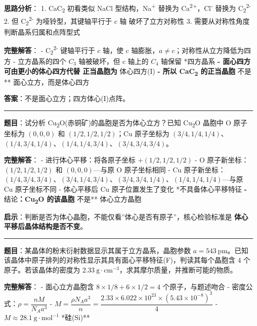 \textbf{思路分析}：
1. CaC\textsubscript{2} 初看类似 NaCl 型结构，Na\textsuperscript{+} 替换为 Ca\textsuperscript{2+}，Cl\textsuperscript{-} 替换为 C\textsubscript{2}\textsuperscript{2-}
2. 但 C\textsubscript{2}\textsuperscript{2-} 为哑铃型，其键轴平行于 c 轴 \箭 破坏了立方对称性
3. 需要从对称性角度判断晶系归属和点阵型式

\textbf{完整解答}：
- C\textsubscript{2}\textsuperscript{2-} 键轴平行于 c 轴，使 c 轴膨胀，\(a \neq c\)；对称性从立方降低为四方
- 立方晶系的四个 \(C_3\) 轴被破坏，但 c 轴上的 \(C_4\) 轴保留 \箭 **四方晶系\textbf{
- 面心四方可由更小的体心四方代替 \箭 正当晶胞为 }体心四方(I)\textbf{
- 所以 CaC\textsubscript{2} 的正当晶胞 }不是** 面心立方，而是体心四方

\textbf{答案}：不是面心立方；四方体心(I)点阵。

\begin{center}\rule{0.5\linewidth}{0.5pt}\end{center}

\textbf{题目}：试分析 Cu\textsubscript{2}O(赤铜矿)的晶胞是否为体心立方？已知 Cu\textsubscript{2}O 晶胞中 O 原子坐标为 \((0, 0, 0)\) 和 \((1/2, 1/2, 1/2)\)；Cu 原子坐标为 \((3/4, 1/4, 1/4)\)、\((1/4, 3/4, 1/4)\)、\((1/4, 1/4, 3/4)\)、\((3/4, 3/4, 3/4)\)。

\textbf{完整解答}：
- 进行体心平移：将各原子坐标 \(+(1/2, 1/2, 1/2)\)
- O 原子新坐标：\((1/2, 1/2, 1/2)\) 和 \((0, 0, 0)\)---与原 O 原子坐标相同
- Cu 原子新坐标：\((1/4, 3/4, 3/4)\)、\((3/4, 1/4, 3/4)\)、\((3/4, 3/4, 1/4)\)、\((1/4, 1/4, 1/4)\)---与原 Cu 原子坐标不同
- 体心平移后 Cu 原子位置发生了变化 \箭 **不具备体心平移特征\textbf{
- }结论\textbf{：Cu\textsubscript{2}O 的该晶胞 }不是** 体心立方晶胞

\textbf{启示}：判断是否为体心晶胞，不能仅看''体心是否有原子''，核心检验标准是 \textbf{体心平移后晶体结构是否不变}。

\begin{center}\rule{0.5\linewidth}{0.5pt}\end{center}

\textbf{题目}：某晶体的粉末衍射数据显示其属于立方晶系，晶胞参数 \(a = 543\ \mathrm{pm}\)。已知该晶体中原子排列的对称性显示其具有面心平移特征(F)，判读其每个晶胞含 4 个原子。若该晶体的密度为 \(2.33\ \mathrm{g\cdot cm^{-3}}\)，求其摩尔质量，并推断可能的物质。

\textbf{完整解答}：
- 面心立方晶胞含 \(8 \times 1/8 + 6 \times 1/2 = 4\) 个原子，与题述吻合
- 密度公式：\(\rho = \dfrac{nM}{N_A a^3}\)
- \(M = \dfrac{\rho N_A a^3}{n} = \dfrac{2.33 \times 6.022\times 10^{23} \times (5.43\times 10^{-8})^3}{4}\)
- \(M \approx 28.1\ \mathrm{g\cdot mol^{-1}}\) \箭 **硅(Si)**

